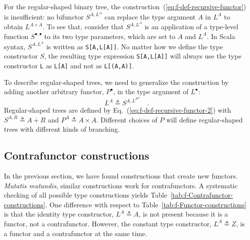 For the regular-shaped binary tree, the construction~(\ref{eq:f-def-recursive-functor})
is insufficient: no bifunctor $S^{A,L^{A}}$ can replace the type
argument $A$ in $L^{A}$ to obtain $L^{A\times A}$. To see that,
consider that $S^{A,L^{A}}$ is an application of a type-level function
$S^{\bullet,\bullet}$ to its two type parameters, which are set to
$A$ and $L^{A}$. In Scala syntax, $S^{A,L^{A}}$ is written as \lstinline!S[A,L[A]]!.
No matter how we define the type constructor $S$, the resulting type
expression \lstinline!S[A,L[A]]! will always use the type constructor
\lstinline!L! as \lstinline!L[A]! and not as \lstinline!L[(A,A)]!. 

To describe regular-shaped trees, we need to generalize the construction
by adding another arbitrary functor, $P^{\bullet}$, in the type argument
of $L^{\bullet}$:
\begin{equation}
L^{A}\triangleq S^{A,L^{P^{A}}}\quad.\label{eq:f-def-recursive-functor-2}
\end{equation}
Regular-shaped trees are defined by Eq.~(\ref{eq:f-def-recursive-functor-2})
with $S^{A,R}\triangleq A+R$ and $P^{A}\triangleq A\times A$. Different
choices of $P$ will define regular-shaped trees with different kinds
of branching.

\subsection{Contrafunctor constructions\label{subsec:f-Contrafunctor-constructions}}

In the previous section, we have found constructions that create new
functors.\emph{ Mutatis mutandis}, similar constructions work for
contrafunctors. A systematic checking of all possible type constructions
yields Table~\ref{tab:f-Contrafunctor-constructions}. One difference
with respect to Table~\ref{tab:f-Functor-constructions} is that
the identity type constructor, $L^{A}\triangleq A$, is not present
because it is a functor, not a contrafunctor. However, the constant
type constructor, $L^{A}\triangleq Z$, is a functor and a contrafunctor
at the same time.

